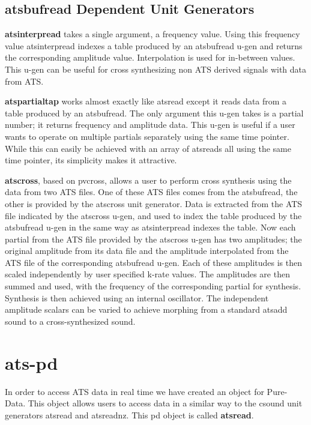 \documentclass[10pt,letterpaper]{article}
\begin{document}
\subsection{atsbufread Dependent Unit Generators}
\textbf{atsinterpread} takes a single argument, a frequency value.  Using this frequency value atsinterpread indexes a table produced by an atsbufread u-gen and returns the corresponding amplitude value.  Interpolation is used for in-between values.  This u-gen can be useful for cross synthesizing non ATS derived signals with data from ATS.

\textbf{atspartialtap} works almost exactly like atsread except it reads data from a table produced by an atsbufread.  The only argument this u-gen takes is a partial number; it returns frequency and amplitude data.  This u-gen is useful if a user wants to operate on multiple partials separately using the same time pointer.  While this can easily be achieved with an array of atsreads all using the same time pointer, its simplicity makes it attractive.

\textbf{atscross}, based on pvcross, allows a user to perform cross synthesis using the data from two ATS files.  One of these ATS files comes from the atsbufread, the other is provided by the atscross unit generator.  Data is extracted from the ATS file indicated by the atscross u-gen, and used to index the table produced by the atsbufread u-gen in the same way as atsinterpread indexes the table.  Now each partial from the ATS file provided by the atscross u-gen has two amplitudes; the original amplitude from its data file and the amplitude interpolated from the ATS file of the corresponding atsbufread u-gen.  Each of these amplitudes is then scaled independently by user specified k-rate values.  The amplitudes are then summed and used, with the frequency of the corresponding partial for synthesis.  Synthesis is then achieved using an internal oscillator.  The independent amplitude scalars can be varied to achieve morphing from a standard atsadd sound to a cross-synthesized sound.

\section{ats-pd}
In order to access ATS data in real time we have created an object for Pure-Data.  This object allows users to access data in a similar way to the csound unit generators atsread and atsreadnz.  This pd object is called \textbf{atsread}.
\end{document}
